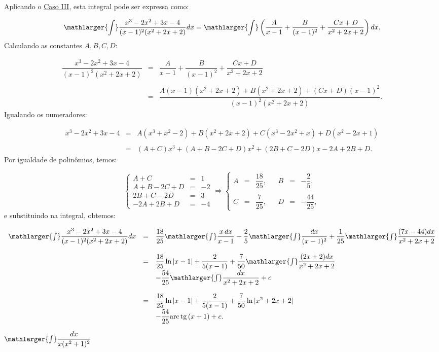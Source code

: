 \cleardoublepage\documentclass[../main.tex]{subfiles}
\begin{document}
\begin{exeresol}
\begin{compactenum}[a)]
\begin{solution}
  Aplicando o \hyperlink{FracParcCasoIII}{Caso III}, esta integral pode ser expressa como:

\[ \mathlarger{\int}\dfrac{x^3-2x^2+3x-4}{(x-1)^2(x^2+2x+2)} dx =\mathlarger{\int}\left(\dfrac{A}{x-1}+\dfrac{B}{(x-1)^2}+ \dfrac{Cx+D}{x^2+2x+2}\right) dx. \]
Calculando as constantes \(A,B,C, D\):

\[ \begin{array}{rcl} \dfrac{x^3-2x^2+3x-4}{(x-1)^2(x^2+2x+2)} &=&\dfrac{A}{x-1}+\dfrac{B}{(x-1)^2}+ \dfrac{Cx+D}{x^2+2x+2}\\ \\ &=& \dfrac{A(x-1)(x^2+2x+2)+B(x^2+2x+2) + (Cx+D)(x-1)^2}{(x-1)^2(x^2+2x+2)}. \end{array} \]
Igualando os numeradores:

\[ \begin{array}{rcl} x^3-2x^2+3x-4 &=& A(x^3+x^2-2)+ B(x^2+2x+2)+C(x^3-2x^2+x)+D(x^2-2x+1)\\ \\ &=&(A+C)x^3+(A+B-2C+D)x^2+(2B+C-2D)x-2A+2B+D. \end{array} \]
Por igualdade de polinômios, temos:

\[ \left\{ \begin{array}{rcr} A+C &=&1\\ A+B-2C+D &=&-2\\ 2B+C-2D&=&3\\ -2A+2B+D&=&-4 \end{array} \right. \Rightarrow \left\{ \begin{array}{ccrcccr} A&=&\dfrac{18}{25},& & B&=&-\dfrac{2}{5},\\ &&&&&\\ C&=&\dfrac{7}{25},& & D&=&-\dfrac{44}{25}, \end{array} \right. \]
e substituindo na integral, obtemos:

\[ \begin{array}{rcl} \mathlarger{\int}\dfrac{x^3-2x^2+3x-4}{(x-1)^2(x^2+2x+2)} dx &=&\dfrac{18}{25}\mathlarger{\int}\dfrac{x\,dx}{x-1} - \dfrac{2}{5}\mathlarger{\int}\dfrac{dx}{(x-1)^2} +\dfrac{1}{25}\mathlarger{\int}\dfrac{(7x-44)dx}{x^2+2x+2}\\ \\ &=& \dfrac{18}{25}\ln|x-1|+ \dfrac{2}{5(x-1)}+ \dfrac{7}{50}\mathlarger{\int}\dfrac{(2x+2)dx}{x^2+2x+2} \\ &&- \dfrac{54}{25}\mathlarger{\int}\dfrac{dx}{x^2+2x+2}+c\\ \\ &=& \dfrac{18}{25}\ln|x-1|+ \dfrac{2}{5(x-1)}+ \dfrac{7}{50}\ln|x^2+2x+2|\\ &&-\dfrac{54}{25}{\rm arc\,tg\,} (x+1)+c. \end{array} \]
\end{solution}
\item \(\mathlarger{\int}\dfrac{dx}{x(x^2+1)^2}\)\\


\end{compactenum}
\end{exeresol}
\end{document}
